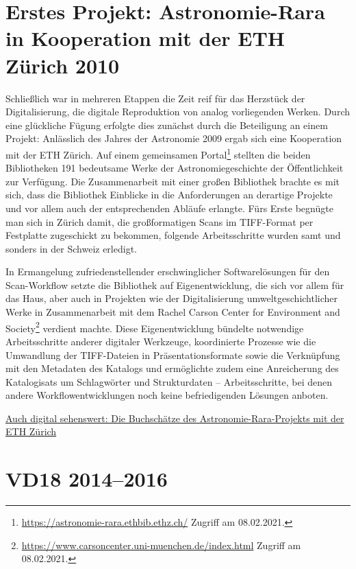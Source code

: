 \documentclass[a4paper,
fontsize=11pt,
oneside,
numbers=noperiodatend,
parskip=half-,
bibliography=totoc,
final
]{scrartcl}
\begin{document}
\hypertarget{erstes-projekt-astronomie-rara-in-kooperation-mit-der-eth-zuxfcrich-2010}{%
\section{Erstes Projekt: Astronomie-Rara in Kooperation mit der
ETH Zürich
2010}\label{erstes-projekt-astronomie-rara-in-kooperation-mit-der-eth-zuxfcrich-2010}}

Schließlich war in mehreren Etappen die Zeit reif für das Herzstück der
Digitalisierung, die digitale Reproduktion von analog vorliegenden
Werken. Durch eine glückliche Fügung erfolgte dies zunächst durch die
Beteiligung an einem Projekt: Anlässlich des Jahres der Astronomie 2009
ergab sich eine Kooperation mit der ETH Zürich. Auf einem gemeinsamen
Portal\footnote{\url{https://astronomie-rara.ethbib.ethz.ch/} Zugriff am
  08.02.2021.} stellten die beiden Bibliotheken 191 bedeutsame Werke der
Astronomiegeschichte der Öffentlichkeit zur Verfügung. Die
Zusammenarbeit mit einer großen Bibliothek brachte es mit sich, dass die
Bibliothek Einblicke in die Anforderungen an derartige Projekte und vor
allem auch der entsprechenden Abläufe erlangte. Fürs Erste begnügte man
sich in Zürich damit, die großformatigen Scans im TIFF-Format per
Festplatte zugeschickt zu bekommen, folgende Arbeitsschritte wurden samt
und sonders in der Schweiz erledigt.

In Ermangelung zufriedenstellender erschwinglicher Softwarelösungen für
den Scan-Workflow setzte die Bibliothek auf Eigenentwicklung, die sich
vor allem für das Haus, aber auch in Projekten wie der Digitalisierung
umweltgeschichtlicher Werke in Zusammenarbeit mit dem Rachel Carson
Center for Environment and Society\footnote{\url{https://www.carsoncenter.uni-muenchen.de/index.html}
  Zugriff am 08.02.2021.} verdient machte. Diese Eigenentwicklung
bündelte notwendige Arbeitsschritte anderer digitaler Werkzeuge,
koordinierte Prozesse wie die Umwandlung der TIFF-Dateien in
Präsentationsformate sowie die Verknüpfung mit den Metadaten des
Katalogs und ermöglichte zudem eine Anreicherung des Katalogisats um
Schlagwörter und Strukturdaten -- Arbeitsschritte, bei denen andere
Workflowentwicklungen noch keine befriedigenden Lösungen anboten.

\href{img/Abb4.jpg}{Auch digital sehenswert: Die Buchschätze des
Astronomie-Rara-Projekts mit der ETH Zürich}

\hypertarget{vd18-20142016}{%
\section{VD18 2014--2016}\label{vd18-20142016}}
\end{document}
